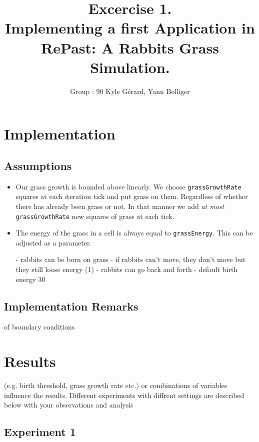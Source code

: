\documentclass[11pt]{article}
\title{\bf Excercise 1.\\ Implementing a first Application in RePast: A Rabbits Grass Simulation.}
\author{Group \textnumero: 90  Kyle Gérard, Yann Bolliger}
\begin{document}
 \maketitle

 \section{Implementation}

\subsection{Assumptions}
\begin{itemize}

\item
Our grass growth is bounded above linearly. We choose \texttt{grassGrowthRate}
squares at each iteration tick and put grass on them. Regardless of whether
there has already been grass or not. In that manner we add \textit{at most} \texttt{grassGrowthRate}
new squares of grass at each tick.

\item
The energy of the grass in a cell is always equal to \texttt{grassEnergy}.
This can be adjusted as a parameter.

 
 - rabbits can be born on grass
 - if rabbits can't move, they don't move but they still loose energy (1)
 - rabbits can go back and forth
 - default birth energy 30

\end{itemize}



\subsection{Implementation Remarks}
of boundary conditions %

 \section{Results}
 (e.g. birth threshold, grass growth rate etc.) or combinations of variables
 influence the results. Different experiments with diffrent settings are
 described below with your observations and analysis

 \subsection{Experiment 1}
\end{document}
